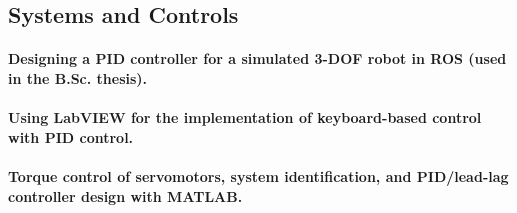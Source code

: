 \documentclass[a4paper]{article}
\begin{document}
\subsection{Systems and Controls}
\paragraph{Designing a PID controller for a simulated 3-DOF robot in ROS (used in the B.Sc. thesis).}
\paragraph{Using LabVIEW for the implementation of keyboard-based control with PID control.}
\paragraph{Torque control of servomotors, system identification, and PID/lead-lag controller design with MATLAB.}%
\end{document}
